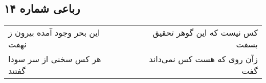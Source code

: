 \begin{center}
\section*{رباعی شماره ۱۴}
\label{sec:sh014}
\begin{longtable}{l p{0.5cm} r}
این بحر وجود آمده بیرون ز نهفت
&&
کس نیست که این گوهر تحقیق بسفت
\\
هر کس سخنی از سر سودا گفتند
&&
زآن روی که هست کس نمی‌داند گفت
\\
\end{longtable}
\end{center}
